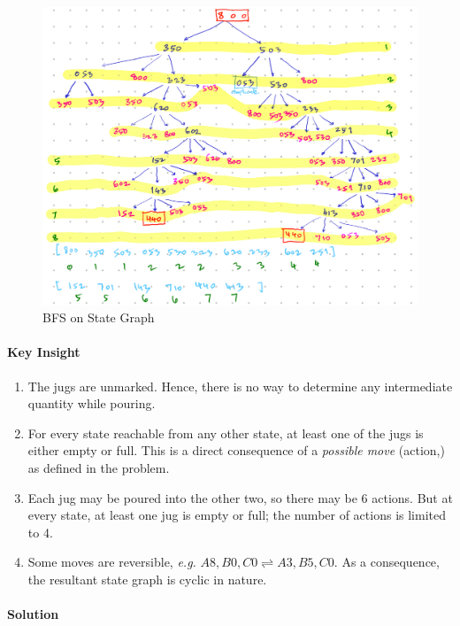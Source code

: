 \documentclass[11pt]{article}
\begin{document}
\begin{figure}[!h]
\centering
\includegraphics[width=.9\linewidth]{images/bfsOnStateGraph.png}
\caption{\label{fig:bfsOnStateGraph}BFS on State Graph}
\end{figure}

\paragraph*{Key Insight}
\label{sec:org86f692f}
\begin{enumerate}
\item The jugs are unmarked.  Hence, there is no way to
determine any intermediate quantity while pouring.
\item For every state reachable from any other state, at
least one of the jugs is either empty or full.  This
is a direct consequence of a \emph{possible move}
(action,) as defined in the problem.
\item Each jug may be poured into the other two, so there
may be 6 actions.  But at every state, at least one
jug is empty or full; the number of actions is
limited to 4.
\item Some moves are reversible, \emph{e.g.} \(A8,B0,C0
   \rightleftharpoons A3,B5,C0\).  As a consequence, the
resultant state graph is cyclic in nature.
\end{enumerate}

\paragraph*{Solution}
\label{sec:org0261f3c}
\end{document}
